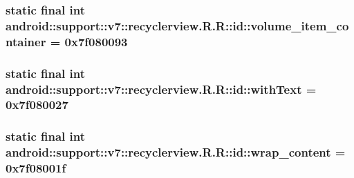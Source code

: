 \hypertarget{classandroid_1_1support_1_1v7_1_1recyclerview_1_1_r_1_1id_c645f40a33c5b6d74b34100fa030e95c}{
\subsubsection[{volume\_\-item\_\-container}]{\setlength{\rightskip}{0pt plus 5cm}static final int android::support::v7::recyclerview.R.R::id::volume\_\-item\_\-container = 0x7f080093}}
\label{classandroid_1_1support_1_1v7_1_1recyclerview_1_1_r_1_1id_c645f40a33c5b6d74b34100fa030e95c}


\hypertarget{classandroid_1_1support_1_1v7_1_1recyclerview_1_1_r_1_1id_75a746de72528c3e6c149d29ef18c66e}{
\subsubsection[{withText}]{\setlength{\rightskip}{0pt plus 5cm}static final int android::support::v7::recyclerview.R.R::id::withText = 0x7f080027}}
\label{classandroid_1_1support_1_1v7_1_1recyclerview_1_1_r_1_1id_75a746de72528c3e6c149d29ef18c66e}


\hypertarget{classandroid_1_1support_1_1v7_1_1recyclerview_1_1_r_1_1id_c260f9d95cfbea28508cebb5a1567960}{
\subsubsection[{wrap\_\-content}]{\setlength{\rightskip}{0pt plus 5cm}static final int android::support::v7::recyclerview.R.R::id::wrap\_\-content = 0x7f08001f}}
\label{classandroid_1_1support_1_1v7_1_1recyclerview_1_1_r_1_1id_c260f9d95cfbea28508cebb5a1567960}




